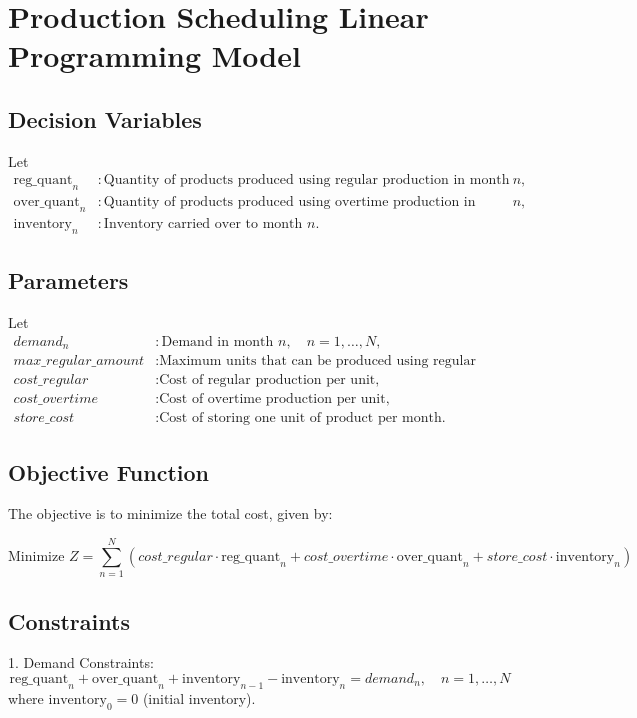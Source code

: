 \documentclass{article}
\begin{document}
\section*{Production Scheduling Linear Programming Model}

\subsection*{Decision Variables}
Let 
\begin{align*}
\text{reg\_quant}_n & : \text{Quantity of products produced using regular production in month } n, \\
\text{over\_quant}_n & : \text{Quantity of products produced using overtime production in month } n, \\
\text{inventory}_n & : \text{Inventory carried over to month } n.
\end{align*}

\subsection*{Parameters}
Let 
\begin{align*}
demand_n & : \text{Demand in month } n, \quad n = 1, \ldots, N, \\
max\_regular\_amount & : \text{Maximum units that can be produced using regular production in any month,} \\
cost\_regular & : \text{Cost of regular production per unit,} \\
cost\_overtime & : \text{Cost of overtime production per unit,} \\
store\_cost & : \text{Cost of storing one unit of product per month.}
\end{align*}

\subsection*{Objective Function}
The objective is to minimize the total cost, given by:

\[
\text{Minimize } Z = \sum_{n=1}^{N} \left( cost\_regular \cdot \text{reg\_quant}_n + cost\_overtime \cdot \text{over\_quant}_n + store\_cost \cdot \text{inventory}_n \right)
\]

\subsection*{Constraints}
1. Demand Constraints:
   \[
   \text{reg\_quant}_n + \text{over\_quant}_n + \text{inventory}_{n-1} - \text{inventory}_n = demand_n, \quad n = 1, \ldots, N
   \]
   where $\text{inventory}_0 = 0$ (initial inventory).
\end{document}
